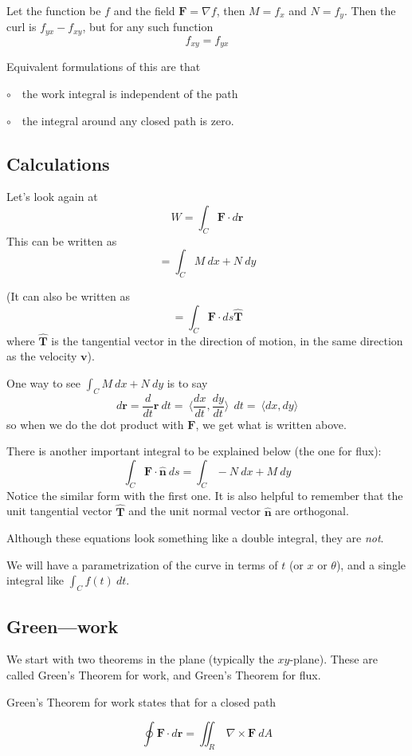\documentclass[11pt, oneside]{article}
\begin{document}
Let the function be $f$ and the field $\mathbf{F} = \nabla f$, then $M=f_x$ and $N=f_y$.  Then the curl is $f_{yx}- f_{xy}$, but for any such function
\[ f_{xy} = f_{yx} \]

Equivalent formulations of this are that 

$\circ \ \ \ $ the work integral is independent of the path

$\circ \ \ \ $ the integral around any closed path is zero.

\subsection*{Calculations}
Let's look again at
\[ W = \int_C \mathbf{F} \cdot d\mathbf{r}  \]
This can be written as
\[ = \int_C M \ dx + N \ dy  \]

(It can also be written as
\[ = \int_C \mathbf{F} \cdot ds \mathbf{\hat{T}}   \]
where $\mathbf{\hat{T}}$ is the tangential vector in the direction of motion, in the same direction as the velocity $\mathbf{v}$).

One way to see $\int_C M \ dx + N \ dy$ is to say
\[ d\mathbf{r} = \frac{d}{dt} \mathbf{r} \ dt = \ \langle \frac{dx}{dt},\frac{dy}{dt} \rangle \  \ dt = \ \langle dx,dy \rangle \]
so when we do the dot product with $\mathbf{F}$, we get what is written above.

There is another important integral to be explained below (the one for flux):
\[ \int_C \mathbf{F} \cdot \hat{\mathbf{n}} \  ds = \int_C -N \ dx + M \ dy  \]
Notice the similar form with the first one.  It is also helpful to remember that the unit tangential vector $\mathbf{\hat{T}}$ and the unit normal vector $\mathbf{\hat{n}}$  are orthogonal.

Although these equations look something like a double integral, they are \emph{not}.

We will have a parametrization of the curve in terms of $t$ (or $x$ or $\theta$), and a single integral like $\int_C f(t) \ dt $.

\subsection*{Green---work}
We start with two theorems in the plane (typically the $xy$-plane).  These are called Green's Theorem for work, and Green's Theorem for flux.  

Green's Theorem for work states that for a closed path

\[ \oint \mathbf{F} \cdot d\mathbf{r}  = \iint_R \ \nabla \times \mathbf{F} \ dA \]
\end{document}
